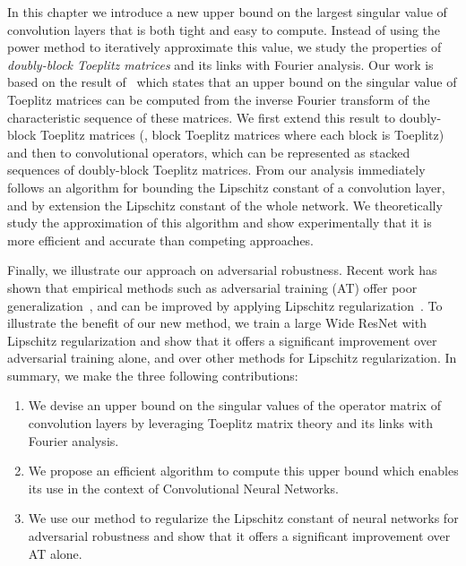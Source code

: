 In this chapter we introduce a new upper bound on the largest singular value of convolution layers that is both tight and easy to compute.
Instead of using the power method to iteratively approximate this value, we study the properties of \emph{doubly-block Toeplitz matrices} and its links with Fourier analysis. 
Our work is based on the result of~\citet{gray2006toeplitz} which states that an upper bound on the singular value of Toeplitz matrices can be computed from the inverse Fourier transform of the characteristic sequence of these matrices.
We first extend this result to doubly-block Toeplitz matrices (\ie, block Toeplitz matrices where each block is Toeplitz) and then to convolutional operators, which can be represented as stacked sequences of doubly-block Toeplitz matrices.
From our analysis immediately follows an algorithm for bounding the Lipschitz constant of a convolution layer, and by extension the Lipschitz constant of the whole network.
We theoretically study the approximation of this algorithm and show experimentally that it is more efficient and accurate than competing approaches.

Finally, we illustrate our approach on adversarial robustness.
Recent work has shown that empirical methods such as adversarial training (AT) offer poor generalization~\cite{schmidt2018adversarially}, and can be improved by applying Lipschitz regularization~\cite{farnia2018generalizable}.
To illustrate the benefit of our new method, we train a large Wide ResNet with Lipschitz regularization and show that it offers a significant improvement over adversarial training alone, and over other methods for Lipschitz regularization.
In summary, we make the three following contributions:
\begin{enumerate}
  \item We devise an upper bound on the singular values of the operator matrix of convolution layers by leveraging Toeplitz matrix theory and its links with Fourier analysis.
  \item We propose an efficient algorithm to compute this upper bound which enables its use in the context of Convolutional Neural Networks.
  \item We use our method to regularize the Lipschitz constant of neural networks for adversarial robustness and show that it offers a significant improvement over AT alone.
\end{enumerate}


